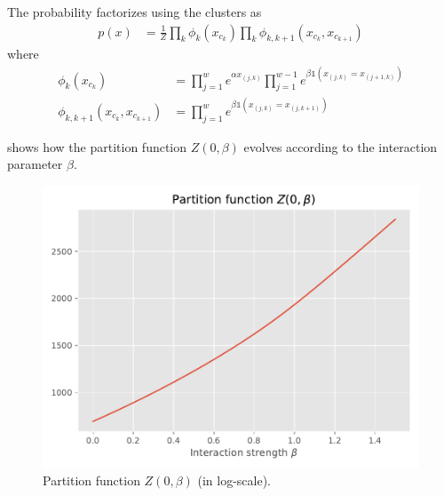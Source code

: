 \documentclass[11pt]{article}
\begin{document}
The probability factorizes using the clusters as
\begin{align*}
	p(x) &= \frac{1}{Z}\prod_k
	\phi_k(x_{c_k})
	\prod_k
	\phi_{k,k+1}(x_{c_k},x_{c_{k+1}})
\end{align*}
where 
\begin{align*}
	\phi_k(x_{c_k}) &= \prod_{j=1}^w e^{\alpha x_{(j,k)}}
	\prod_{j=1}^{w-1} e^{
		\beta \mathds{1}(
			x_{(j,k)}=x_{(j+1,k)}
		)
	}  \\
	\phi_{k,k+1}(x_{c_k}, x_{c_{k+1}}) &=
	\prod_{j=1}^w e^{
		\beta \mathds{1}(
			x_{(j,k)}=x_{(j,k+1)}
		)
	}
\end{align*}

 shows how the partition function $Z(0,\beta)$ evolves according to the interaction parameter $\beta$.


\begin{figure}
	\centering
	\includegraphics[width=.8\linewidth]{images/graphs/ising_partition.pdf}
	\caption{Partition function $Z(0,\beta)$ (in log-scale).}\label{fig:IsingPartFunction}
\end{figure}
\end{document}
